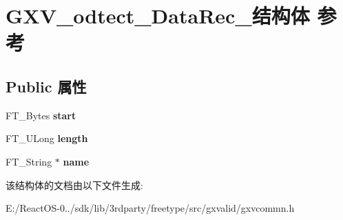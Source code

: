 \hypertarget{struct_g_x_v__odtect___data_rec__}{}\section{G\+X\+V\+\_\+odtect\+\_\+\+Data\+Rec\+\_\+结构体 参考}
\label{struct_g_x_v__odtect___data_rec__}
\subsection*{Public 属性}
\begin{DoxyCompactItemize}
\item 
\mbox{\label{struct_g_x_v__odtect___data_rec___ac6c97acde7851edfcee409675400cac0}} 
F\+T\+\_\+\+Bytes {\bfseries start}
\item 
\mbox{\label{struct_g_x_v__odtect___data_rec___ab64ce9893f2919bbd09625a25ee0c4ad}} 
F\+T\+\_\+\+U\+Long {\bfseries length}
\item 
\mbox{\label{struct_g_x_v__odtect___data_rec___a912965e9b4d5cc2e2624ee5ca2510d03}} 
F\+T\+\_\+\+String $\ast$ {\bfseries name}
\end{DoxyCompactItemize}


该结构体的文档由以下文件生成\+:\begin{DoxyCompactItemize}
\item 
E\+:/\+React\+O\+S-\/0../sdk/lib/3rdparty/freetype/src/gxvalid/gxvcommn.\+h\end{DoxyCompactItemize}
